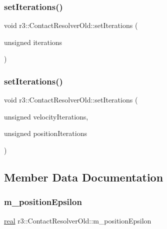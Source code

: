 \subsubsection{\texorpdfstring{set\+Iterations()}{setIterations()}\hspace{0.1cm}{\footnotesize\ttfamily [1/2]}}
{\footnotesize\ttfamily void r3\+::\+Contact\+Resolver\+Old\+::set\+Iterations (\begin{DoxyParamCaption}\item[{unsigned}]{iterations }\end{DoxyParamCaption})}

\mbox{\label{classr3_1_1_contact_resolver_old_ae5e46bdbe789c1930696f2ea291c151f}} 
\subsubsection{\texorpdfstring{set\+Iterations()}{setIterations()}\hspace{0.1cm}{\footnotesize\ttfamily [2/2]}}
{\footnotesize\ttfamily void r3\+::\+Contact\+Resolver\+Old\+::set\+Iterations (\begin{DoxyParamCaption}\item[{unsigned}]{velocity\+Iterations,  }\item[{unsigned}]{position\+Iterations }\end{DoxyParamCaption})}



\subsection{Member Data Documentation}
\mbox{\label{classr3_1_1_contact_resolver_old_a3c78dc280aa7b4c225efe5ad0c463dba}} 
\subsubsection{\texorpdfstring{m\+\_\+position\+Epsilon}{m\_positionEpsilon}}
{\footnotesize\ttfamily \mbox{\hyperlink{namespacer3_ab2016b3e3f743fb735afce242f0dc1eb}{real}} r3\+::\+Contact\+Resolver\+Old\+::m\+\_\+position\+Epsilon\hspace{0.3cm}{\ttfamily [protected]}}

